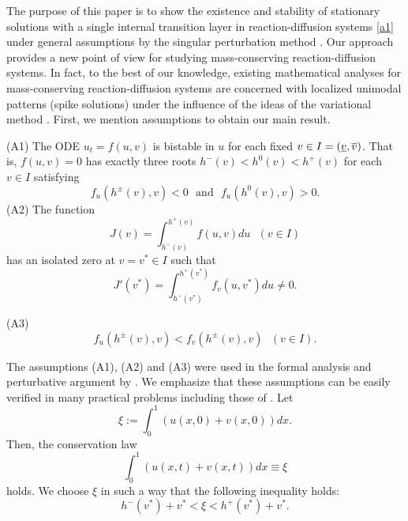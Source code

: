 \documentclass[a4,10pt]{article}
\begin{document}
The purpose of this paper is to show the existence and stability 
of stationary solutions with a
single internal transition layer in reaction-diffusion 
systems \eqref{a1} under general assumptions by the singular perturbation method \cite{HS, I, MTH, NF}.
Our approach provides a new point of view for studying mass-conserving 
reaction-diffusion systems.
In fact, to the best of 
our knowledge, existing mathematical analyses for mass-conserving 
reaction-diffusion systems
are concerned with localized unimodal patterns (spike solutions) under the 
influence of the ideas of the variational method \cite{CMS,ET,JM,EKS,LS,MO}.
First, we mention assumptions to obtain our main result.

\begin{assume}\label{ass1}
{\rm (A1)} 
The ODE $u_t = f(u, v)$
is bistable in $u$ for each fixed $v \in I = (\underline{v}, \overline{v})$.
That is, $f(u, v)=0$ has exactly three roots 
$h^-(v) < h^0(v) < h^+(v) $ for each $v \in I$ satisfying
%
\[%
f_u ( h^{\pm}(v), v ) < 0
\ \ \
\text{and}
\ \ \ 
f_u ( h^{0}(v), v ) > 0. 
\]%
%
{\rm (A2)} The function 
%
\begin{equation}\label{a4}
J(v) = \int_{h^-(v)}^{h^+(v)} f(u, v)du \ \ \ ( v \in I)
\end{equation}
%
has an isolated zero at $v = v^* \in I$ such that 
%
\begin{equation}\label{a4x}
J'(v^*) = \int_{h^-(v^*)}^{h^+(v^*)} f_v(u, v^*)du \neq 0.
\end{equation}

\no
{\rm (A3)} 
\[%
f_u ( h^{\pm}(v), v ) < f_v ( h^{\pm}(v), v )  \ \ \ ( v \in I).
\]%
\end{assume}

The assumptions (A1), (A2) and (A3) were used in the formal analysis and
perturbative argument by \cite{MJE2}. 
We emphasize that these assumptions can be easily verified in 
many practical problems including those of \cite{MJE1, MJE2}. 
Let
%
\[%
\xi := \int_0^1 \left( u(x, 0) + v(x, 0) \right) dx.
\]%
%
Then, the conservation law
%
\begin{equation}\label{a2}
\int_0^1 \left( u(x, t) + v(x, t) \right) dx \equiv \xi
\end{equation}
%
holds. We choose $\xi$ in such a way that the following inequality holds:
%
\begin{equation}\label{a6}
h^-(v^*) + v^* < \xi < h^+(v^*) + v^*.
\end{equation}
\end{document}
